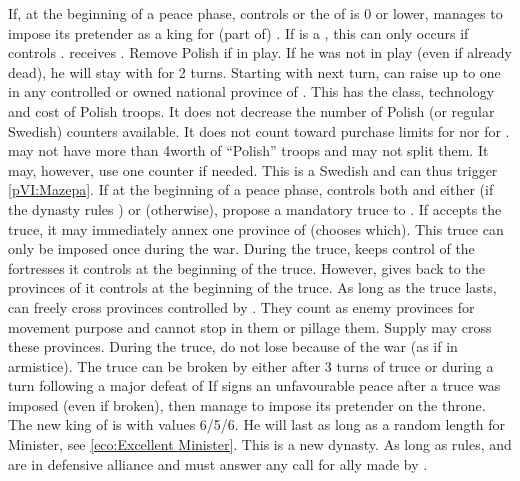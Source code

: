 \begin{digressions}
  \phpaix
  \aparag If, at the beginning of a peace phase, \SUE controls \villeVarsovie
  or the \STAB of \POL is 0 or lower, \SUE manages to impose its pretender as
  a king for (part of) \POL.
  \bparag If \payspologne is a \MIN, this can only occurs if \SUE controls
  \villeVarsovie.
  \bparag \SUE receives . Remove Polish
  \leaderPoniatowski if in play. If he was not in play (even if already dead),
  he will stay with \SUE for 2 turns.
  \bparag Starting with next turn, \SUE can raise up to one \ARMY\faceplus in
  any controlled or owned national province of \POL. This \ARMY has the class,
  technology and cost of Polish troops. It does not decrease the number of
  Polish (or regular Swedish) counters available. It does not count toward
  purchase limits for \SUE nor for \POL.
  \bparag \SUE may not have more than 4\LD worth of ``Polish'' troops and may
  not split them. It may, however, use one \LD counter if needed.
  \bparag This is a Swedish \ARMY and can thus trigger \ref{pVI:Mazepa}.
  \aparag If at the beginning of a peace phase, \SUE controls both
  \villeVarsovie and either \villeDresden (if the \payssaxe dynasty rules
  \POL) or \villeCracovie (otherwise), \POL propose a mandatory truce to \SUE.
  \bparag If \SUE accepts the truce, it may immediately annex one province of
  \POL (\SUE chooses which).
  \bparag This truce can only be imposed once during the war.
  \bparag During the truce, \SUE keeps control of the fortresses it controls
  at the beginning of the truce.
  \bparag However, \POL gives back to \SUE the provinces of \SUE it controls
  at the beginning of the truce.
  \bparag As long as the truce lasts, \SUE can freely cross provinces
  controlled by \POL. They count as enemy provinces for movement purpose and
  \SUE cannot stop in them or pillage them. Supply may cross these provinces.
  \bparag During the truce, \POL do not lose \STAB because of the war (as if
  in armistice).
  \bparag The truce can be broken by \POL either after 3 turns of truce or
  during a turn following a major defeat of \SUE
  \aparag\label{pVI:GNW:Stanislas Victory} If \POL signs an unfavourable
  peace after a truce was imposed (even if broken), then \SUE manage to impose
  its pretender on the throne.
  \bparag The new king of \POL is \monarqueStanislas with values 6/5/6. He
  will last as long as a random length for Minister, see \ref{eco:Excellent
    Minister}. This is a new dynasty.
  \bparag \label{pVI:GNW:Stanislas} As long as \monarqueStanislas rules, \POL
  and \SUE are in defensive alliance and \POL must answer any call for ally
  made by \SUE.



\end{digressions}
